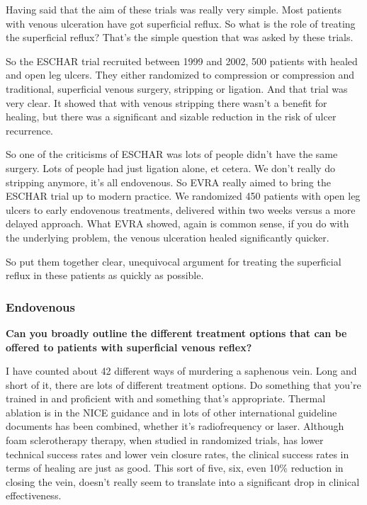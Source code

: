 \documentclass[
]{book}
\begin{document}
Having said that the aim of these trials was really very simple. Most
patients with venous ulceration have got superficial reflux. So what is
the role of treating the superficial reflux? That's the simple question
that was asked by these trials.

So the ESCHAR trial recruited between 1999 and 2002, 500 patients with
healed and open leg ulcers. They either randomized to compression or
compression and traditional, superficial venous surgery, stripping or
ligation. And that trial was very clear. It showed that with venous
stripping there wasn't a benefit for healing, but there was a
significant and sizable reduction in the risk of ulcer
recurrence.\citep{gohel2007}

So one of the criticisms of ESCHAR was lots of people didn't have the
same surgery. Lots of people had just ligation alone, et cetera. We
don't really do stripping anymore, it's all endovenous. So EVRA really
aimed to bring the ESCHAR trial up to modern practice. We randomized 450
patients with open leg ulcers to early endovenous treatments, delivered
within two weeks versus a more delayed approach. What EVRA showed, again
is common sense, if you do with the underlying problem, the venous
ulceration healed significantly quicker.\citep{gohel2018}

So put them together clear, unequivocal argument for treating the
superficial reflux in these patients as quickly as possible.

\hypertarget{endovenous}{%
\subsubsection{Endovenous}\label{endovenous}}

\textbf{Can you broadly outline the different treatment options that can be
offered to patients with superficial venous reflex?}

I have counted about 42 different ways of murdering a saphenous vein.
Long and short of it, there are lots of different treatment options. Do
something that you're trained in and proficient with and something
that's appropriate. Thermal ablation is in the NICE guidance and in lots
of other international guideline documents has been combined, whether
it's radiofrequency or laser. Although foam sclerotherapy therapy, when
studied in randomized trials, has lower technical success rates and
lower vein closure rates, the clinical success rates in terms of healing
are just as good. This sort of five, six, even 10\% reduction in closing
the vein, doesn't really seem to translate into a significant drop in
clinical effectiveness.
\end{document}
